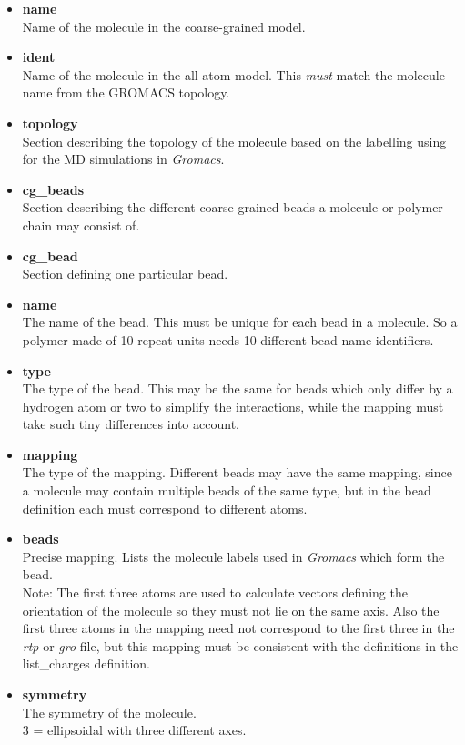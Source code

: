 \begin{itemize}
 \item {\bf name} \\
 Name of the molecule in the coarse-grained model. 
 \item {\bf ident} \\
 Name of the molecule in the all-atom model. This \emph{must} match the molecule name from the GROMACS topology.
 \item {\bf topology} \\
 Section describing the topology of the molecule based on the labelling using for the MD simulations in \emph{Gromacs}.
 \item {\bf cg\_beads} \\
 Section describing the different coarse-grained beads a molecule or polymer chain may consist of.
 \item {\bf cg\_bead} \\
 Section defining one particular bead.
 \item {\bf name} \\
 The name of the bead. This must be unique for each bead in a molecule. So a polymer made of 10 repeat units needs 10 different bead name identifiers.
 \item {\bf type} \\
 The type of the bead. This may be the same for beads which only differ by a hydrogen atom or two to simplify the interactions, while the mapping must take such tiny differences into account.
 \item {\bf mapping} \\
 The type of the mapping. Different beads may have the same mapping, since a molecule may contain multiple beads of the same type, but in the bead definition each must correspond to different atoms.
 \item {\bf beads} \\
 Precise mapping. Lists the molecule labels used in \emph{Gromacs} which form the bead. \\
 Note: The first three atoms are used to calculate vectors defining the orientation of the molecule so they must not lie on the same axis. Also the first three atoms in the mapping need not correspond to the first three in the \emph{rtp} or \emph{gro} file, but this mapping must be consistent with the definitions in the list\_charges definition.
 \item {\bf symmetry} \\
 The symmetry of the molecule. \\
 3 = ellipsoidal with three different axes.


\end{itemize}
